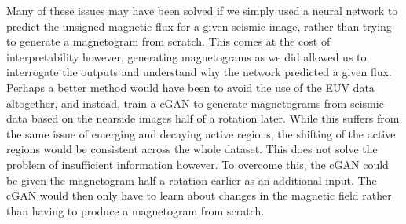 \documentclass[11pt,a4paper,onecolumn]{report}
\begin{document}
Many of these issues may have been solved if we simply used a neural network to
predict the unsigned magnetic flux for a given seismic image, rather than trying
to generate a magnetogram from scratch. This comes at the cost of
interpretability however, generating magnetograms as we did allowed us to
interrogate the outputs and understand why the network predicted a given flux.
Perhaps a better method would have been to avoid the use of the EUV data
altogether, and instead, train a cGAN to generate magnetograms from seismic data
based on the nearside images half of a rotation later. While this suffers from
the same issue of emerging and decaying active regions, the shifting of the
active regions would be consistent across the whole dataset. This does not solve
the problem of insufficient information however. To overcome this, the cGAN could
be given the magnetogram half a rotation earlier as an additional input. The
cGAN would then only have to learn about changes in the magnetic field rather
than having to produce a magnetogram from scratch. \\






\end{document}
